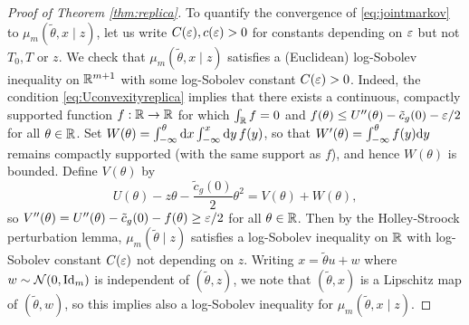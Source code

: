 \begin{proof}[Proof of Theorem \ref{thm:replica}]
To quantify the convergence of \eqref{eq:jointmarkov} to $\mu_m(\tilde\theta,x
\mid z)$,
let us write $C(\varepsilon),c(\varepsilon)>0$ for constants depending on $\varepsilon$
but not $T_0,T$ or $z$. We check that $\mu_m(\tilde\theta,x \mid z)$ satisfies a
(Euclidean) log-Sobolev inequality on $\mathbb{R}^{m+1}$
with some log-Sobolev constant $C(\varepsilon)>0$. Indeed,
the condition \eqref{eq:Uconvexityreplica} implies that there exists a
continuous, compactly supported function
$f:\mathbb{R} \to \mathbb{R}$ for which $\int_{\mathbb{R}} f=0$
and $f(\theta) \leq U''(\theta)-\tilde c_g(0)-\varepsilon/2$ for all $\theta \in \mathbb{R}$.
Set $W(\theta)=\int_{-\infty}^\theta  \mathrm{d} x \int_{-\infty}^x \mathrm{d} y\,f(y)$, so that
$W'(\theta)=\int_{-\infty}^\theta f(y)\mathrm{d} y$ remains compactly supported (with
the same support as $f$),
and hence $W(\theta)$ is bounded. Define $V(\theta)$ by
\begin{equation}\label{eq:logsobolevdecomp}
U(\theta)-z\theta-\frac{\tilde c_g(0)}{2}\theta^2=V(\theta)+W(\theta),
\end{equation}
so $V''(\theta)=U''(\theta)-\tilde c_g(0)-f(\theta) \geq \varepsilon/2$ for all
$\theta \in \mathbb{R}$. Then by the Holley-Stroock perturbation lemma,
$\mu_m(\tilde\theta \mid z)$ satisfies a log-Sobolev inequality on $\mathbb{R}$ with
log-Sobolev constant $C(\varepsilon)$ not depending on $z$.
Writing $x=\tilde\theta u+w$ where $w \sim \mathcal{N}(0,\mathrm{Id}_m)$ is independent of
$(\tilde\theta,z)$, we note that $(\tilde\theta,x)$ is a Lipschitz map of
$(\tilde\theta,w)$, so this implies also a log-Sobolev inequality
for $\mu_m(\tilde\theta,x \mid z)$.


\end{proof}
